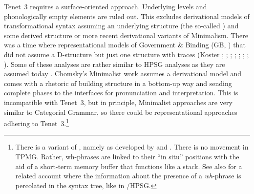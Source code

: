 \documentclass[output=paper]{langsci/langscibook}
\begin{document}
Tenet~3 requires a surface-oriented approach. Underlying levels and phonologically empty elements
are ruled out. This excludes derivational models of transformational syntax assuming an underlying
structure (the so-called ) and some derived structure or more recent derivational variants of Minimalism. There was a time
where representational models of Government \& Binding (GB, \citealt{Chomsky81a}) that did not assume a D-structure but just one structure with
traces (Koster \citeyear[\page ]{Koster78b-u}; \citeyear[]{Koster87a-u}; 
\citealp{KT91a}; \citealp[Section~1.4]{Haider93a}; 
\citealp[]{Frey93a}; \citealp[--88, 177--178]{Lohnstein93a-u}; \citealp[]{FC94a}; \citealp[]{Veenstra98a}). Some of these analyses are rather similar to HPSG
analyses as they are assumed today \citep{Kiss95a,BvN98a,Meurers2000b,Mueller2005c,MuellerGS,MuellerGermanic}. Chomsky's Minimalist work \citep{Chomsky95a-u} assumes a derivational model and comes
with a rhetoric of building structure in a bottom-up way and sending complete phases to the
interfaces for pronunciation and interpretation. This is incompatible with Tenet~3, but in principle,
Minimalist approaches are very similar to Categorial Grammar, so there could be representational
approaches adhering to Tenet~3.\footnote{%
  There is a variant of  \citep{Stabler2010b}, namely  as developed by \citet{Chesi2004a-u,Chesi2007a-u} and \citet{BC2006a-u,BC2012a-u}. There is
  no movement in TPMG. Rather, wh-phrases are linked to their ``in situ'' positions with the
aid of a short-term memory  buffer that functions like a stack. See
also \citet{Hunter2010a-u,Hunter2018a-u} for a related account where the
information about the presence of a \emph{wh}-phrase is percolated in the
syntax tree, like in /HPSG. 
}
\end{document}
